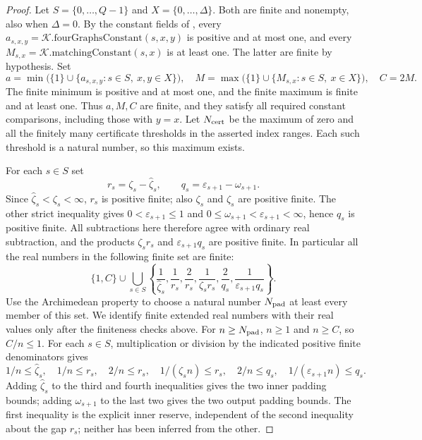 \begin{proof}
Let $S=\{0,\ldots,Q-1\}$ and $X=\{0,\ldots,\Delta\}$.
Both are finite and nonempty, also when $\Delta=0$.
By the constant fields of ,
every $a_{s,x,y}=\mathcal K.\mathrm{fourGraphsConstant}(s,x,y)$ is
positive and at most one, and every
$M_{s,x}=\mathcal K.\mathrm{matchingConstant}(s,x)$ is at least one.
The latter are finite by hypothesis. Set
\[
 a=\min\bigl(\{1\}\cup\{a_{s,x,y}:s\in S,\ x,y\in X\}\bigr),
 \quad
 M=\max\bigl(\{1\}\cup\{M_{s,x}:s\in S,\ x\in X\}\bigr),
 \quad C=2M.
\]
The finite minimum is positive and at most one, and the finite maximum
is finite and at least one. Thus $a,M,C$ are finite, and they satisfy
all required constant comparisons, including those with $y=x$.
Let $N_{\rm cert}$ be the maximum of zero and all the finitely many
certificate thresholds in the asserted index ranges. Each such
threshold is a natural number, so this maximum exists.

For each $s\in S$ set
\[
 r_s=\zeta_s-\widehat\zeta_s,\qquad
 q_s=\varepsilon_{s+1}-\omega_{s+1}.
\]
Since $\widehat\zeta_s<\zeta_s<\infty$, $r_s$ is positive finite;
also $\zeta_s$ and $\widehat\zeta_s$ are positive finite.
The other strict inequality gives
$0<\varepsilon_{s+1}\leq1$ and
$0\leq\omega_{s+1}<\varepsilon_{s+1}<\infty$, hence $q_s$ is positive
finite. All subtractions here therefore agree with ordinary real
subtraction, and the products $\zeta_s r_s$ and
$\varepsilon_{s+1}q_s$ are positive finite. In particular all the real
numbers in the following finite set are finite:
\[
 \{1,C\}\cup\bigcup_{s\in S}
 \left\{\frac1{\widehat\zeta_s},\frac1{r_s},
 \frac2{r_s},\frac1{\zeta_s r_s},
 \frac2{q_s},\frac1{\varepsilon_{s+1}q_s}\right\}.
\]
Use the Archimedean property to choose a natural number $N_{\rm pad}$
at least every member of this set. We identify finite extended real
numbers with their real values only after the finiteness checks above.
For $n\geq N_{\rm pad}$, $n\geq1$ and $n\geq C$, so $C/n\leq1$.
For each $s\in S$, multiplication or division by the indicated positive
finite denominators gives
\[
 1/n\leq\widehat\zeta_s,\quad1/n\leq r_s,
 \quad2/n\leq r_s,\quad1/(\zeta_s n)\leq r_s,
 \quad2/n\leq q_s,\quad
 1/(\varepsilon_{s+1}n)\leq q_s.
\]
Adding $\widehat\zeta_s$ to the third and fourth inequalities gives
the two inner padding bounds; adding $\omega_{s+1}$ to the last two
gives the two output padding bounds. The first inequality is the
explicit inner reserve, independent of the second inequality about the
gap $r_s$; neither has been inferred from the other.


\end{proof}
